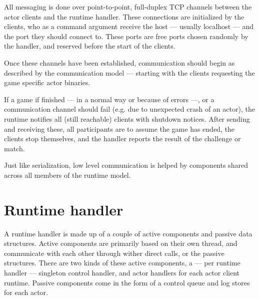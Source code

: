		All messaging is done over point-to-point, full-duplex TCP channels between the actor clients and the runtime handler. These connections are initialized by the clients, who as a command argument receive the host --- usually localhost --- and the port they should connect to. These ports are free ports chosen randomly by the handler, and reserved before the start of the clients.
		
		Once these channels have been established, communication should begin as described by the communication model --- starting with the clients requesting the game specific actor binaries.
		
		If a game if finished --- in a normal way or because of errors ---, or a communication channel should fail (e.g. due to unexpected crash of an actor), the runtime notifies all (still reachable) clients with shutdown notices. After sending and receiving these, all participants are to assume the game has ended, the clients stop themselves, and the handler reports the result of the challenge or match.

		Just like serialization, low level communication is helped by components shared across all members of the runtime model.

	\section{Runtime handler}

	A runtime handler is made up of a couple of active components and passive data structures. Active components are primarily based on their own thread, and communicate with each other through wither direct calls, or the passive structures.
	There are two kinds of these active components, a --- per runtime handler --- singleton control handler, and actor handlers for each actor client runtime. Passive components come in the form of a control queue and log stores for each actor.
		
